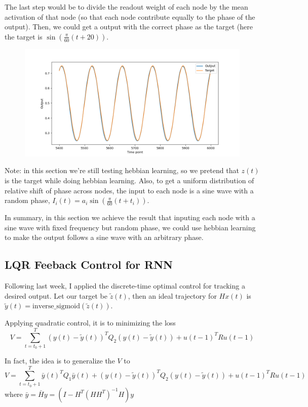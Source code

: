 \documentclass[12pt, a4paper]{article}
\begin{document}
The last step would be to divide the readout weight of each node by the mean activation of that node (so that each node contribute equally to the phase of the output). Then, we could get a output with the correct phase as the target (here the target is $\sin(\frac{\pi}{60}(t+20))$.

\begin{figure}[H]
    \centering
    \includegraphics[width=\textwidth]{RNN/FORCE/fig/FORCE_phase_output.png}
\end{figure}

Note: in this section we're still testing hebbian learning, so we pretend that $z(t)$ is the target while doing hebbian learning. Also, to get a uniform distribution of relative shift of phase across nodes, the input to each node is a sine wave with a random phase, $I_i(t) = a_i \sin(\frac{\pi}{60}(t+t_i))$. 

In summary, in this section we achieve the result that inputing each node with a sine wave with fixed frequency but random phase, we could use hebbian learning to make the output follows a sine wave with an arbitrary phase.

\newpage

\subsection*{LQR Feeback Control for RNN}

Following last week, I applied the discrete-time optimal control for tracking a desired output. Let our target be $\tilde{z}(t)$, then an ideal trajectory for $Hx(t)$ is $\tilde{y}(t) = \text{inverse\_sigmoid}(\tilde{z}(t))$. 

Applying quadratic control, it is to minimizing the loss $$V = \sum_{t=t_0+1}^T (y(t) - \tilde{y}(t))^T Q_2 (y(t)- \tilde{y}(t)) + u(t-1)^T R u(t-1)$$

In fact, the idea is to generalize the $V$ to $$V = \sum_{t=t_0+1}^T \bar{y}(t)^T Q_1 \bar{y}(t) + (y(t) - \tilde{y}(t))^T Q_2 (y(t)- \tilde{y}(t)) + u(t-1)^T R u(t-1)$$ where $\bar{y} = \bar{H}y = (I - H^T(HH^{T})^{-1}H)y$
\end{document}
